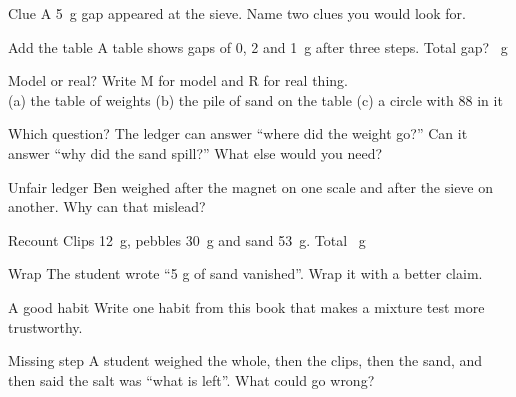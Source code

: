 \begin{puzzle}{Clue}
A 5~g gap appeared at the sieve. Name two clues you would look for. \wline[6cm]
\end{puzzle}

\clearpage

\begin{puzzle}{Add the table}
A table shows gaps of 0, 2 and 1~g after three steps. Total gap? \wline[1.6cm]~g
\end{puzzle}

\begin{puzzle}{Model or real?}
Write M for model and R for real thing.\\
(a) the table of weights \wline[1cm] \quad (b) the pile of sand on the table \wline[1cm] \quad (c) a circle with 88 in it \wline[1cm]
\end{puzzle}

\begin{puzzle}{Which question?}
The ledger can answer ``where did the weight go?'' Can it answer ``why did the sand spill?'' \wline[2cm] What else would you need? \wline[4cm]
\end{puzzle}

\begin{puzzle}{Unfair ledger}
Ben weighed after the magnet on one scale and after the sieve on another. Why can that mislead? \wline[6cm]
\end{puzzle}

\clearpage

\begin{puzzle}{Recount}
Clips 12~g, pebbles 30~g and sand 53~g. Total \wline[1.6cm]~g
\end{puzzle}

\begin{puzzle}{Wrap}
The student wrote ``5 g of sand vanished''. Wrap it with a better claim. \wline[6cm]
\end{puzzle}

\begin{puzzle}{A good habit}
Write one habit from this book that makes a mixture test more trustworthy. \wline[6cm]
\end{puzzle}

\begin{puzzle}{Missing step}
A student weighed the whole, then the clips, then the sand, and then said the salt was ``what is left''. What could go wrong? \wline[6cm]
\end{puzzle}

\clearpage

